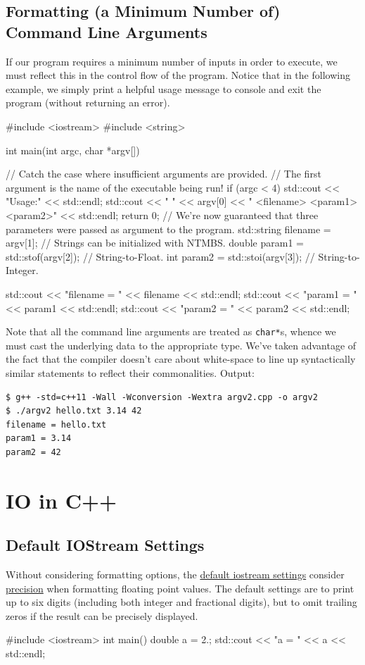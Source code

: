 \documentclass[12pt,letterpaper,twoside]{article}
\begin{document}
\subsection{Formatting ({\small a Minimum Number of}) Command Line Arguments}
If our program requires a minimum number of inputs in order to execute, we must
reflect this in the control flow of the program. Notice that in the following example, 
we simply print a helpful usage message to console and exit the program (without returning
an error).
\begin{cpp}
#include <iostream>
#include <string>

int main(int argc, char *argv[]) {
  // Catch the case where insufficient arguments are provided.
  // The first argument is the name of the executable being run!
  if (argc < 4) {
    std::cout << "Usage:" << std::endl;
    std::cout << " " << argv[0] << " <filename> <param1> <param2>" << std::endl;
    return 0;
  }
  // We're now guaranteed that three parameters were passed as argument to the program.
  std::string filename = argv[1];       // Strings can be initialized with NTMBS.
  double param1 = std::stof(argv[2]);   // String-to-Float.
  int param2    = std::stoi(argv[3]);   // String-to-Integer.

  std::cout << "filename = " << filename << std::endl;
  std::cout << "param1 = "   << param1   << std::endl;
  std::cout << "param2 = "   << param2   << std::endl;
}
\end{cpp}

Note that all the command line arguments are treated as \texttt{char*}s, whence we must 
cast the underlying data to the appropriate type. We've taken advantage
of the fact that the compiler doesn't care about white-space to line up syntactically
similar statements to reflect their commonalities.
Output:


{\small
\begin{verbatim}
$ g++ -std=c++11 -Wall -Wconversion -Wextra argv2.cpp -o argv2
$ ./argv2 hello.txt 3.14 42
filename = hello.txt
param1 = 3.14
param2 = 42
\end{verbatim}
}

\vspace{-3ex}
\section{IO in C++}
\vspace{-2ex}
\subsection{Default IOStream Settings}
Without considering formatting options, 
the \href{https://en.cppreference.com/w/cpp/io/basic_ios/init}{default iostream settings} 
consider 
\href{https://en.cppreference.com/w/cpp/io/ios_base/precision}{precision} when 
formatting floating point values. The default settings 
are to print up to six digits (including both integer and fractional digits), but to 
omit trailing zeros if the result can be precisely displayed.
\begin{cpp}
#include <iostream>
int main() {
  double a = 2.;
  std::cout << "a = " << a << std::endl;
}
\end{cpp}
\end{document}
